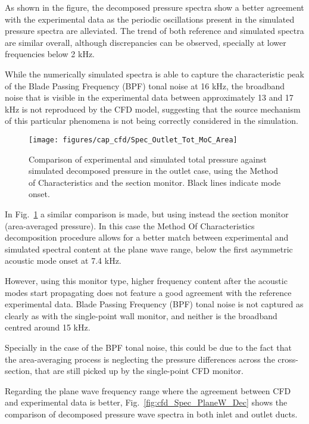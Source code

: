 As shown in the figure, the decomposed pressure spectra show a better agreement with the experimental data as the periodic oscillations present in the simulated pressure spectra are alleviated. The trend of both reference and simulated spectra are similar overall, although discrepancies can be observed, specially at lower frequencies below 2 kHz. 

While the numerically simulated spectra is able to capture the characteristic peak of the Blade Passing Frequency (BPF) tonal noise at 16 kHz, the broadband noise that is visible in the experimental data between approximately 13 and 17 kHz is not reproduced by the CFD model, suggesting that the source mechanism of this particular phenomena is not being correctly considered in the simulation.

\begin{figure}[htb!]
\centering
\texttt{[image: figures/cap\_cfd/Spec\_Outlet\_Tot\_MoC\_Area]}
\caption[Comparison of decomposed CFD spectrum (section)]{Comparison of experimental and simulated total pressure against simulated decomposed pressure in the outlet case, using the Method of Characteristics and the section monitor. Black lines indicate mode onset.}
\label{fig:cfd_Spec_Outlet_Tot_Moc_Area}
\end{figure}

In Fig.~\ref{fig:cfd_Spec_Outlet_Tot_Moc_Area} a similar comparison is made, but using instead the section monitor (area-averaged pressure). In this case the Method Of Characteristics decomposition procedure allows for a better match between experimental and simulated spectral content at the plane wave range, below the first asymmetric acoustic mode onset at 7.4 kHz.

However, using this monitor type, higher frequency content after the acoustic modes start propagating does not feature a good agreement with the reference experimental data. Blade Passing Frequency (BPF) tonal noise is not captured as clearly as with the single-point wall monitor, and neither is the broadband centred around 15 kHz. 

Specially in the case of the BPF tonal noise, this could be due to the fact that the area-averaging process is neglecting the pressure differences across the cross-section, that are still picked up by the single-point CFD monitor.

Regarding the plane wave frequency range where the agreement between CFD and experimental data is better, Fig.~\ref{fig:cfd_Spec_PlaneW_Dec} shows the comparison of decomposed pressure wave spectra in both inlet and outlet ducts. 

